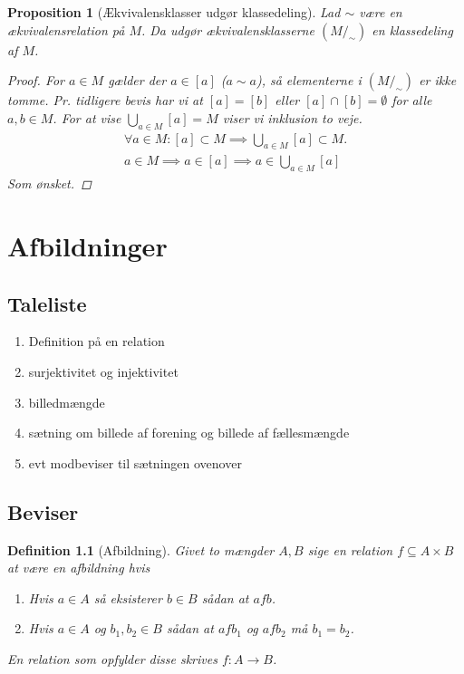 \documentclass[10pt,twoside,openany,final]{memoir}
\theoremstyle{break}
\newtheorem{proposition}[section]{Proposition}
\newtheorem{definition}[section]{Definition}
\theoremstyle{Break}
\begin{document}
\begin{proposition}[Ækvivalensklasser udgør klassedeling]
Lad $\sim$ være en ækvivalensrelation på $M$. Da udgør ækvivalensklasserne $(M/_{\sim})$ en klassedeling af $M$. 
\begin{proof}
For $a \in M$ gælder  der $a \in [a]$ ($a \sim a$), så elementerne i $(M/_{\sim})$ er ikke tomme. Pr. tidligere bevis har vi at $[a]=[b]$ eller $[a] \cap [b]=\emptyset$ for alle $a,b \in M$. For at vise $\displaystyle \bigcup_{a \in M} [a]=M$ viser vi inklusion to veje.
\begin{align*}
\forall a \in M \colon [a] \subset M \implies \bigcup_{a \in M} [a] \subset M.\\
a \in M \implies a \in [a] \implies a \in \bigcup_{a \in M} [a]
\end{align*}
Som ønsket.
\end{proof}
\end{proposition}

\chapter{Afbildninger}
\section*{Taleliste}
\begin{enumerate}
\item Definition på en relation 
\item surjektivitet og injektivitet
\item billedmængde
\item sætning om  billede af forening og billede af fællesmængde
\item evt modbeviser til sætningen ovenover
\end{enumerate}

\section*{Beviser}
\begin{definition}[Afbildning]
Givet to mængder $A,B$ sige en relation $f \subseteq A \times B$ at være en afbildning hvis
\begin{enumerate}
\item Hvis $a \in A$ så eksisterer $b \in B$ sådan at $afb$.
\item Hvis $a \in A$ og $b_{1},b_{2} \in B$ sådan at $afb_{1}$ og $afb_{2}$ må $b_{1}=b_{2}$. 
\end{enumerate}
En relation som opfylder disse skrives $f \colon A \to B$.
\end{definition}
\end{document}
